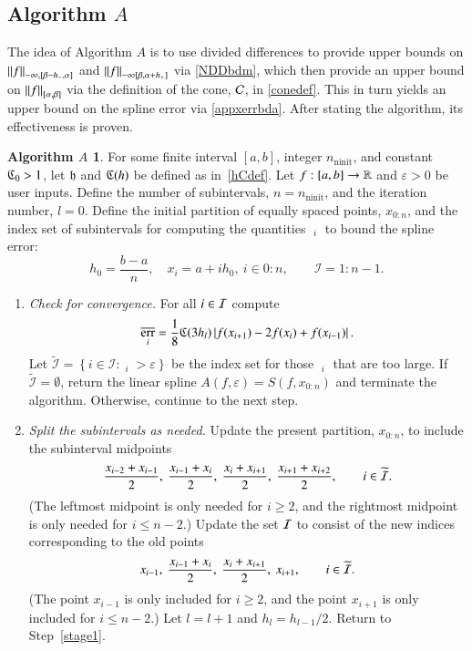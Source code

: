 \documentclass[review]{elsarticle}
\newcommand{\abstol}{\varepsilon}
\newcommand{\zton}{0\!:\!n}
\theoremstyle{definition}
\newtheorem*{algoA}{Algorithm $A$}
\DeclareMathOperator{\ninit}{ninit}
\DeclareMathOperator{\oerr}{\overline{err}}
\begin{document}
\subsection{Algorithm $A$} \label{subsec:appxalgo}

The idea of Algorithm $A$ is to use divided differences to provide upper bounds
on $\norm[-\infty,{[\beta - h_-, \alpha]}]{f}$ and $\norm[-\infty{[\beta,
\alpha+h_+]}]{f}$ via \eqref{NDDbdm}, which then provide an upper bound on
$\norm[{[\alpha,\beta]}]{f}$ via the definition of the cone, $\cc$, in
\eqref{conedef}. This in turn yields an upper bound on the spline error via
\eqref{appxerrbda}. After stating the algorithm, its effectiveness is proven.

\begin{algoA} \label{AlgoA}
For some finite interval $[a,b]$, integer $n_{\ninit}$, and constant $\fC_0 >
1$, let $\fh$ and $\fC(h)$ be defined as in~\eqref{hCdef}. Let $f:[a,b] \to
\reals$ and $\abstol >0$ be user inputs. Define the number of subintervals,
$n=n_{\ninit}$, and the iteration number, $l = 0$. Define the initial partition
of equally spaced points, $x_{0:n}$, and the index set of subintervals for
computing the quantities $\oerr_i$ to bound the spline error:
\[
h_0 =\frac{b-a}{n}, \quad  x_i=a+ ih_0, \ i \in \zton, \qquad \mathcal{I} = 1\!:\!n-1.
\]

\begin{enumerate}[\em Step 1.]

\item \label{stage1} \emph{Check for convergence.} For all $i \in \ci$ compute
\begin{equation} \label{oerrdef}
\oerr_i = \frac{1}{8} \fC(3h_l)\abs{f(x_{i+1}) - 2f(x_i) + f(x_{i-1})}.
\end{equation}
Let $\widetilde{\mathcal{I}} = \left\{i \in \mathcal{I}: \oerr_i  > \abstol \right\}$ 
be the index set for those $\oerr_i $ that are too large.   If $\widetilde{\mathcal{I}} =
\emptyset$, return the linear spline $A(f,\abstol) = S(f, x_{0:n})$ and terminate
the algorithm. Otherwise, continue to the next step.

\item \label{stage2} \emph{Split the subintervals as needed.} 
Update the present partition, $x_{0:n}$, to include the subinterval midpoints
\[
  \frac{x_{i-2} +x_{i-1}}{2}, \ \frac{x_{i-1} +x_{i}}{2}, 
\ \frac{x_{i} +x_{i+1}}{2}, \  \frac{x_{i+1} +x_{i+2}}{2}, \qquad i \in \widetilde{\ci}.
\] 
(The leftmost midpoint is only needed for $i \ge 2$, and the rightmost midpoint
is only needed for $i \le n-2$.) Update the set $\ci$ to consist of the new
indices corresponding to the old points
\[
x_{i-1}, \ \frac{x_{i-1} +x_{i}}{2}, \ \frac{x_{i} +x_{i+1}}{2}, \  x_{i+1}, 
\qquad i \in \widetilde{\ci}.
\] 
(The point $x_{i-1}$ is only included for $ i \ge 2$, and the point $x_{i+1}$ is
only included for $i \le n-2$.) Let $l = l+1$ and $h_l = h_{l-1}/2$.  Return to 
Step~\ref{stage1}.
\end{enumerate}
\end{algoA}
\end{document}
